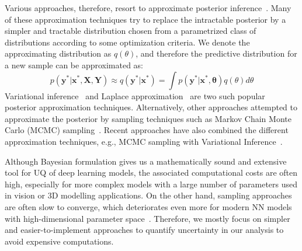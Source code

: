 Various approaches, therefore, resort to approximate posterior inference~\cite{VIPractical, VIReview, VIUncNN, CorrUncDNN, SVI, LaplaceApprox}. Many of these approximation techniques try to replace the intractable posterior by a simpler and tractable distribution chosen from a parametrized class of distributions according to some optimization criteria. We denote the approximating distribution as $q(\theta)$, and therefore the predictive distribution for a new sample can be approximated as: 
\begin{equation}\label{approxpreddist}
    p(\mathbf{y^*|x^*, X, Y}) \approx q(\mathbf{y^*|x^*}) = \int p(\mathbf{y^*|x^*, \theta}) q(\theta)d\theta
\end{equation}
Variational inference~\cite{VIReview} and Laplace approximation~\cite{LaplaceApprox} are two such popular posterior approximation techniques. Alternatively, other approaches attempted to approximate the posterior by sampling techniques such as Markov Chain Monte Carlo (MCMC) sampling~\cite{ProbMLBook}. Recent approaches have also combined the different approximation techniques, e.g., MCMC sampling with Variational Inference~\cite{MCVIBridge}. 

Although Bayesian formulation gives us a mathematically sound and extensive tool for UQ of deep learning models, the associated computational costs are often high, especially for more complex models with a large number of parameters used in vision or 3D modelling applications. On the other hand, sampling approaches are often slow to converge, which deteriorates even more for modern NN models with high-dimensional parameter space~\cite{BayesNN}. Therefore, we mostly focus on simpler and easier-to-implement approaches to quantify uncertainty in our analysis to avoid expensive computations.



